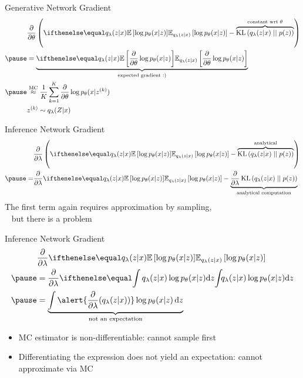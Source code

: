\begin{frame}[plain]{Generative Network Gradient}
\begin{equation*}
\begin{aligned}
&\pdv{\theta} \left( \E[q_\lambda(z|x)]{\log p_\theta(x|z)} - \overbrace{\KL{q_\lambda(z|x)}{p(z)}}^{\text{constant wrt }\theta} \right) \\ \pause 
&=\underbrace{\E[q_\lambda(z|x)]{\pdv{\theta}\log p_\theta(x|z)}}_{\text{expected gradient :)}} \\ \pause
&\overset{\text{MC}}{\approx} \frac{1}{K}\sum_{k=1}^{K}
\pdv{\theta} \log p_\theta(x|z^{(k)}) \\
&z^{(k)} \sim q_\lambda(Z|x)
\end{aligned}
\end{equation*}
\pause
{}
\end{frame}

\begin{frame}{Inference Network Gradient}
\begin{equation*}
\begin{aligned}
&\pdv{\lambda}\left(\E[q_\lambda(z|x)]{\log p_\theta(x|z)} - \overbrace{\KL{q_\lambda(z|x)}{p(z)}}^{\text{analytical}} \right) \\ \pause
=&\pdv{\lambda}\E[q_\lambda(z|x)]{\log p_\theta(x|z)} - \underbrace{\pdv{\lambda}\KL{q_\lambda(z|x)}{p(z)}}_{\text{analytical computation}} \\
\end{aligned}
\end{equation*}
\pause
The first term again requires approximation by sampling, \\
~ but there is a problem

\end{frame}

\begin{frame}{Inference Network Gradient}
\begin{equation*}
\begin{aligned}
&\pdv{\lambda}\E[q_\lambda(z|x)]{\log p_\theta(x|z)} \\ \pause
&= \pdv{\lambda} \intl{q_\lambda(z|x)\log p_\theta(x|z)}{z} \\ \pause
&=  \underbrace{\int \alert{\pdv{\lambda}(q_\lambda(z|x))}\log p_\theta(x|z) \dd{z}}_{\text{not an expectation}} 
\end{aligned}
\end{equation*}

\pause

\begin{itemize}
	\item MC estimator is non-differentiable: cannot sample first\\ \pause
	\item Differentiating the expression does not yield an expectation: cannot approximate via MC
\end{itemize}

\end{frame}

